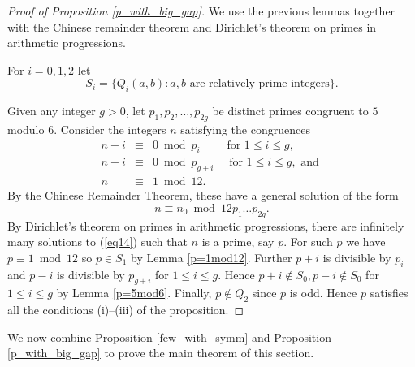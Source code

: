 \documentclass[reqno]{amsproc}  %
\begin{document}
\begin{proof}[Proof of Proposition \ref{p_with_big_gap}]
We use the previous lemmas together with the Chinese remainder theorem and Dirichlet's theorem on primes in arithmetic progressions. 

For $i=0,1,2$ let  
    $$S_i = \{ Q_i(a,b) : a,b \text{ are relatively prime integers} \}.$$
    
Given any integer $g>0$,
let $p_1, p_2, \ldots, p_{2g}$ be distinct primes congruent to $5$ modulo $6$.
Consider the integers $n$ satisfying the congruences
\begin{eqnarray*}
 n-i &\equiv& 0 \bmod p_i   \qquad\text{ for }1 \le i \le g,\\
  n+i &\equiv& 0 \bmod p_{g+i} \quad\text{ for }1 \le i \le g, \text{ and }\\
 n &\equiv& 1 \bmod 12.
 \end{eqnarray*}
By the Chinese Remainder Theorem, these have a general solution of the form
\begin{equation}  \label{eq14}
n \equiv n_0 \bmod 12 p_1 \ldots p_{2g}. 
 \end{equation}
By Dirichlet's theorem on primes in arithmetic progressions, there are infinitely
many solutions to (\ref{eq14}) such that $n$ is a prime, say $p$. For such $p$ we have
$p \equiv 1 \bmod 12$ so $p \in S_1$ by Lemma \ref{p=1mod12}. Further
$p+i$ is divisible by $p_i$ and $p-i$ is divisible by $p_{g+i}$ for $1 \le i \le g$.
Hence $p+i \notin S_0, p-i \notin S_0$ for $1\le i \le g$ by Lemma \ref{p=5mod6}.
Finally, $p \notin Q_2$ since $p$ is odd. Hence $p$ satisfies all the conditions (i)--(iii)
of the proposition.
\end{proof}


We now combine Proposition \ref{few_with_symm} and Proposition \ref{p_with_big_gap} 
to prove the main theorem of this section. 
\end{document}
